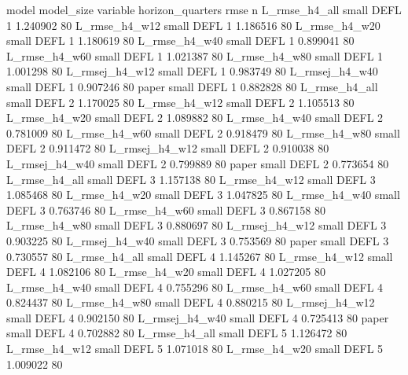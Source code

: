          model model_size variable  horizon_quarters     rmse  n
 L_rmse_h4_all      small     DEFL                 1 1.240902 80
 L_rmse_h4_w12      small     DEFL                 1 1.186516 80
 L_rmse_h4_w20      small     DEFL                 1 1.180619 80
 L_rmse_h4_w40      small     DEFL                 1 0.899041 80
 L_rmse_h4_w60      small     DEFL                 1 1.021387 80
 L_rmse_h4_w80      small     DEFL                 1 1.001298 80
L_rmsej_h4_w12      small     DEFL                 1 0.983749 80
L_rmsej_h4_w40      small     DEFL                 1 0.907246 80
         paper      small     DEFL                 1 0.882828 80
 L_rmse_h4_all      small     DEFL                 2 1.170025 80
 L_rmse_h4_w12      small     DEFL                 2 1.105513 80
 L_rmse_h4_w20      small     DEFL                 2 1.089882 80
 L_rmse_h4_w40      small     DEFL                 2 0.781009 80
 L_rmse_h4_w60      small     DEFL                 2 0.918479 80
 L_rmse_h4_w80      small     DEFL                 2 0.911472 80
L_rmsej_h4_w12      small     DEFL                 2 0.910038 80
L_rmsej_h4_w40      small     DEFL                 2 0.799889 80
         paper      small     DEFL                 2 0.773654 80
 L_rmse_h4_all      small     DEFL                 3 1.157138 80
 L_rmse_h4_w12      small     DEFL                 3 1.085468 80
 L_rmse_h4_w20      small     DEFL                 3 1.047825 80
 L_rmse_h4_w40      small     DEFL                 3 0.763746 80
 L_rmse_h4_w60      small     DEFL                 3 0.867158 80
 L_rmse_h4_w80      small     DEFL                 3 0.880697 80
L_rmsej_h4_w12      small     DEFL                 3 0.903225 80
L_rmsej_h4_w40      small     DEFL                 3 0.753569 80
         paper      small     DEFL                 3 0.730557 80
 L_rmse_h4_all      small     DEFL                 4 1.145267 80
 L_rmse_h4_w12      small     DEFL                 4 1.082106 80
 L_rmse_h4_w20      small     DEFL                 4 1.027205 80
 L_rmse_h4_w40      small     DEFL                 4 0.755296 80
 L_rmse_h4_w60      small     DEFL                 4 0.824437 80
 L_rmse_h4_w80      small     DEFL                 4 0.880215 80
L_rmsej_h4_w12      small     DEFL                 4 0.902150 80
L_rmsej_h4_w40      small     DEFL                 4 0.725413 80
         paper      small     DEFL                 4 0.702882 80
 L_rmse_h4_all      small     DEFL                 5 1.126472 80
 L_rmse_h4_w12      small     DEFL                 5 1.071018 80
 L_rmse_h4_w20      small     DEFL                 5 1.009022 80
